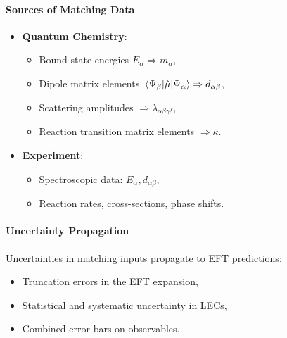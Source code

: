 \paragraph{Sources of Matching Data}
\begin{itemize}
  \item \textbf{Quantum Chemistry}:
  \begin{itemize}
    \item Bound state energies \( E_\alpha \Rightarrow m_\alpha \),
    \item Dipole matrix elements \( \mel{\Psi_\beta}{\hat{\mu}}{\Psi_\alpha} \Rightarrow d_{\alpha\beta} \),
    \item Scattering amplitudes \( \Rightarrow \lambda_{\alpha\beta\gamma\delta} \),
    \item Reaction transition matrix elements \( \Rightarrow \kappa \).
  \end{itemize}
  \item \textbf{Experiment}:
  \begin{itemize}
    \item Spectroscopic data: \( E_\alpha, d_{\alpha\beta} \),
    \item Reaction rates, cross-sections, phase shifts.
  \end{itemize}
\end{itemize}

\paragraph{Uncertainty Propagation}
Uncertainties in matching inputs propagate to EFT predictions:
\begin{itemize}
  \item Truncation errors in the EFT expansion,
  \item Statistical and systematic uncertainty in LECs,
  \item Combined error bars on observables.
\end{itemize}

